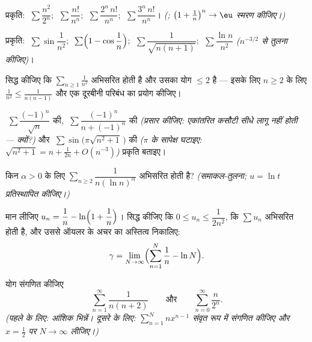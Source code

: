 \begin{exercise}[$\star$]\label{exo:b1:series:2}
प्रकृति: $\;\sum \dfrac{n^2}{2^n}$; $\;\sum \dfrac{n!}{n^n}$; $\;\sum
\dfrac{2^n\,n!}{n^n}$; $\;\sum \dfrac{3^n\,n!}{n^n}$। \emph{(;
$\bigl(1 + \frac1n\bigr)^n \to \eu$ स्मरण कीजिए।)}
\end{exercise}

\begin{exercise}[$\star$]\label{exo:b1:series:3}
प्रकृति: $\;\sum \sin\dfrac{1}{n^2}$; $\;\sum \Bigl(1 - \cos\dfrac1n\Bigr)$;
$\;\sum \dfrac{1}{\sqrt{n(n+1)}}$; $\;\sum \dfrac{\ln n}{n^2}$
\emph{($n^{-3/2}$ से तुलना कीजिए)}।
\end{exercise}

\begin{exercise}[$\star$]\label{exo:b1:series:4}
सिद्ध कीजिए कि $\sum_{n\geq1} \frac{1}{n^2}$ अभिसरित होती है और उसका योग
$\leq 2$ है --- इसके लिए $n \geq 2$ के लिए $\frac{1}{n^2} \leq
\frac{1}{n(n-1)}$ और एक दूरबीनी परिबंध का प्रयोग कीजिए।
\end{exercise}

\begin{exercise}[$\star\star$]\label{exo:b1:series:5}
$\;\sum \dfrac{(-1)^n}{\sqrt n}$ की, $\;\sum \dfrac{(-1)^n}{n + (-1)^n}$ की
\emph{(प्रसार कीजिए: एकांतरित कसौटी सीधे लागू नहीं होती --- क्यों?)} और
$\;\sum \sin\bigl(\pi\sqrt{n^2+1}\,\bigr)$ की \emph{($\pi$ के सापेक्ष घटाइए:
$\sqrt{n^2+1} = n + \frac{1}{2n} + O(n^{-3})$)} प्रकृति बताइए।
\end{exercise}

\begin{exercise}[$\star\star$]\label{exo:b1:series:6}
किन $\alpha > 0$ के लिए $\sum_{n \geq 2} \dfrac{1}{n (\ln n)^{\alpha}}$
अभिसरित होती है? \emph{(समाकल-तुलना; $u = \ln t$ प्रतिस्थापित कीजिए।)}
\end{exercise}

\begin{exercise}[$\star\star$]\label{exo:b1:series:7}
मान लीजिए $u_n = \dfrac{1}{n} - \ln\Bigl(1 + \dfrac1n\Bigr)$। सिद्ध कीजिए कि
$0 \leq u_n \leq \dfrac{1}{2n^2}$, कि $\sum u_n$ अभिसरित होती है, और उससे
ऑयलर के अचर का अस्तित्व निकालिए:
\[
\gamma = \lim_{N \to \infty} \Bigl( \sum_{n=1}^{N} \frac 1n - \ln N
\Bigr) .
\]
\end{exercise}

\begin{exercise}[$\star\star$]\label{exo:b1:series:8}
योग संगणित कीजिए
\[
\sum_{n=1}^{\infty} \frac{1}{n(n+2)}
\qquad\text{और}\qquad
\sum_{n=0}^{\infty} \frac{n}{2^n} .
\]
\emph{(पहले के लिए: आंशिक भिन्नें। दूसरे के लिए: $\sum_{n=1}^{N} n x^{n-1}$
संवृत रूप में संगणित कीजिए और $x = \frac12$ पर $N \to \infty$ लीजिए।)}
\end{exercise}

